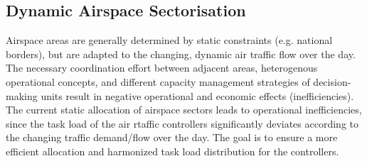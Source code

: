 \subsection{Dynamic Airspace Sectorisation}

Airspace areas are generally determined by static constraints (e.g. national borders), but are adapted to the changing, dynamic air traffic flow over the day. 
The necessary coordination effort between adjacent areas, heterogenous operational concepts, and different capacity management strategies of decision-making units result in negative operational and economic effects (inefficiencies). 
The current static allocation of airspace sectors leads to operational inefficiencies, since the task load of the air rtaffic controllers significantly deviates according to the changing traffic demand/flow over the day. 
The goal is to ensure a more efficient allocation and harmonized task load distribution for the controllers. 